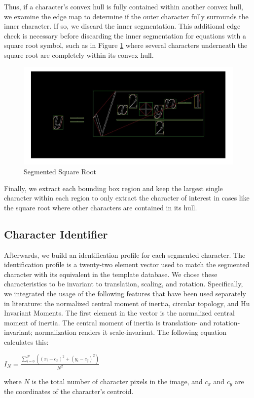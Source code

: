 \documentclass[journal]{IEEEtran}
\begin{document}
Thus, if a character’s convex hull is fully contained within another convex hull, we examine the edge map to determine if the outer character fully surrounds the inner character. If so, we discard the inner segmentation. This additional edge check is necessary before discarding the inner segmentation for equations with a square root symbol, such as in Figure \ref{fig:seg_eq} where several characters underneath the square root are completely within its convex hull. 

\begin{figure}[!t]
    \centering
    \includegraphics[width=\columnwidth]{seg_eq}
    \caption{Segmented Square Root}
    \label{fig:seg_eq}
\end{figure}
Finally, we extract each bounding box region and keep the largest single character within each region to only extract the character of interest in cases like the square root where other characters are contained in its hull.

\subsection{Character Identifier}
Afterwards, we build an identification profile for each segmented character. The identification profile is a twenty-two element vector used to match the segmented character with its equivalent in the template database.
We chose these characteristics to be invariant to translation, scaling, and rotation. Specifically, we integrated the usage of the following features that have been used separately in literature:  the normalized central moment of inertia, circular topology\cite{Torres-Mendez:article_typical}, and Hu Invariant Moments\cite{Potocnik:article_typical}.
The first element in the vector is the normalized central moment of inertia\cite{Torres-Mendez:article_typical}. The central moment of inertia is translation- and rotation-invariant; normalization renders it scale-invariant. The following equation calculates this:
\begin{center}
    
\(
I_N = \frac{\sum\limits_{i=0}^N((x_i-c_x)^2 + (y_i - c_y)^2)}{N^2}
\)
\end{center}
where $N$ is the total number of character pixels in the image, and $c_x$ and $c_y$ are the coordinates of the character’s centroid.
\end{document}

